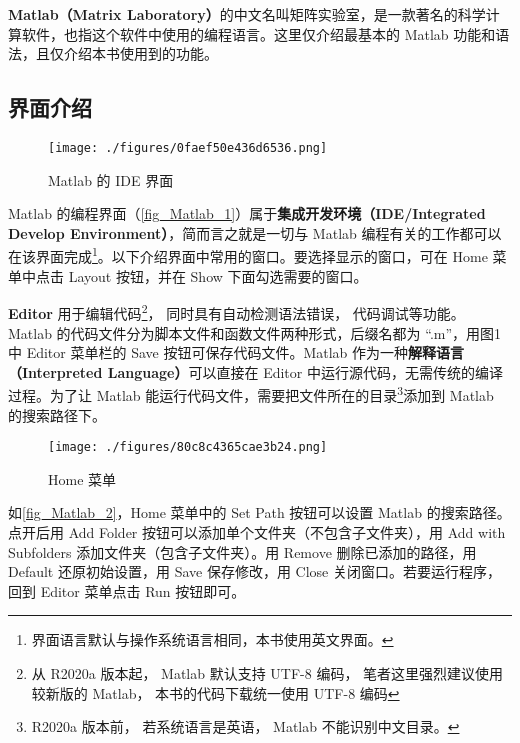 
\textbf{Matlab（Matrix Laboratory）}的中文名叫矩阵实验室，是一款著名的科学计算软件，也指这个软件中使用的编程语言。这里仅介绍最基本的 Matlab 功能和语法，且仅介绍本书使用到的功能。


\subsection{界面介绍}

\begin{figure}[ht]
\centering
\texttt{[image: ./figures/0faef50e436d6536.png]}
\caption{Matlab 的 IDE 界面}\label{fig_Matlab_1}
\end{figure}

Matlab 的编程界面（\autoref{fig_Matlab_1}）属于\textbf{集成开发环境（IDE/Integrated Develop Environment）}，简而言之就是一切与 Matlab 编程有关的工作都可以在该界面完成\footnote{界面语言默认与操作系统语言相同，本书使用英文界面。}。以下介绍界面中常用的窗口。要选择显示的窗口，可在 Home 菜单中点击 Layout 按钮，并在 Show 下面勾选需要的窗口。

\textbf{Editor} 用于编辑代码\footnote{从 R2020a 版本起， Matlab 默认支持 UTF-8 编码， 笔者这里强烈建议使用较新版的 Matlab， 本书的代码下载统一使用 UTF-8 编码}， 同时具有自动检测语法错误， 代码调试等功能。 Matlab 的代码文件分为脚本文件和函数文件两种形式，后缀名都为 “.m”，用图1中 Editor 菜单栏的 Save 按钮可保存代码文件。Matlab 作为一种\textbf{解释语言（Interpreted Language）}可以直接在 Editor 中运行源代码，无需传统的编译过程。为了让 Matlab 能运行代码文件，需要把文件所在的目录\footnote{R2020a 版本前， 若系统语言是英语， Matlab 不能识别中文目录。}添加到 Matlab 的搜索路径下。

\begin{figure}[ht]
\centering
\texttt{[image: ./figures/80c8c4365cae3b24.png]}
\caption{Home 菜单}\label{fig_Matlab_2}
\end{figure}

如\autoref{fig_Matlab_2}，Home 菜单中的 Set Path 按钮可以设置 Matlab 的搜索路径。点开后用 Add Folder 按钮可以添加单个文件夹（不包含子文件夹），用 Add with Subfolders 添加文件夹（包含子文件夹）。用 Remove 删除已添加的路径，用 Default 还原初始设置，用 Save 保存修改，用 Close 关闭窗口。若要运行程序，回到 Editor 菜单点击 Run 按钮即可。


